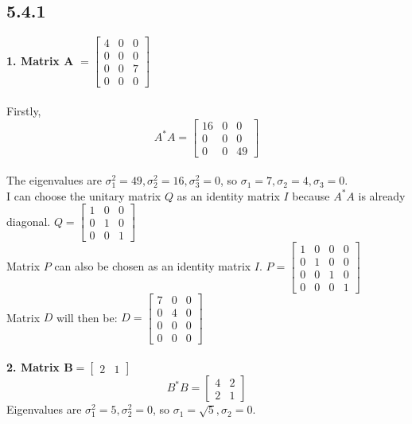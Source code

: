 \documentclass[manuscript,screen,review]{acmart}
\begin{document}
\subsection*{5.4.1}
\textbf{1. Matrix A} $=\left[\begin{array}{ccc}4 & 0 & 0 \\ 0 & 0 & 0 \\ 0 & 0 & 7 \\ 0 & 0 & 0\end{array}\right]$
\\
\\
Firstly, $$A^* A=\left[\begin{array}{lll}16 & 0 & 0 \\ 0 & 0 & 0 \\ 0 & 0 & 49\end{array}\right]$$
\\
The eigenvalues are $\sigma_1^2=49, \sigma_2^2=16, \sigma_3^2=0$, so $\sigma_1=7, \sigma_2=4, \sigma_3=0$.
\\
I can choose the unitary matrix $Q$ as an identity matrix $I$ because $A^* A$ is already diagonal.
$Q=\left[\begin{array}{lll}1 & 0 & 0 \\ 0 & 1 & 0 \\ 0 & 0 & 1\end{array}\right]$
\\
Matrix $P$ can also be chosen as an identity matrix $I$.
$P=\left[\begin{array}{llll}1 & 0 & 0 & 0 \\ 0 & 1 & 0 & 0 \\ 0 & 0 & 1 & 0 \\ 0 & 0 & 0 & 1\end{array}\right]$
\\
Matrix $D$ will then be:
$D=\left[\begin{array}{lll}7 & 0 & 0 \\ 0 & 4 & 0 \\ 0 & 0 & 0 \\ 0 & 0 & 0\end{array}\right]$
\\
\\
\textbf{2. Matrix B}$=\left[\begin{array}{ll}2 & 1\end{array}\right]$
$$
B^* B=\left[\begin{array}{ll}
4 & 2 \\
2 & 1
\end{array}\right]
$$
Eigenvalues are $\sigma_1^2=5, \sigma_2^2=0$, so $\sigma_1=\sqrt{5}, \sigma_2=0$.
\end{document}
